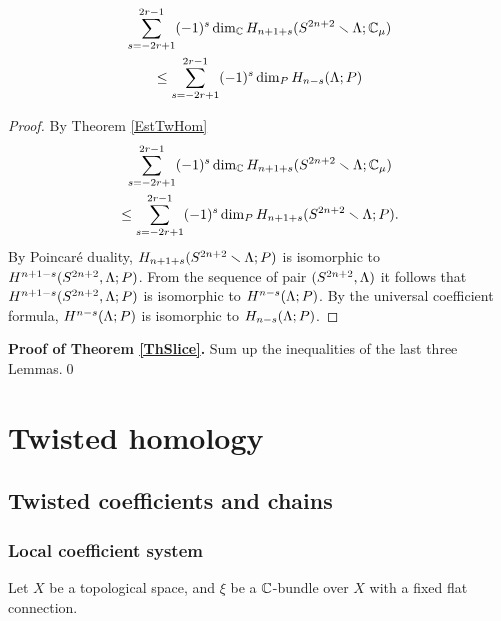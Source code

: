 \documentclass{article}
\numberwithin{equation}{section}
\begin{document}
\begin{lem}\label{Lemma4Th}
\begin{multline} 
\sum_{s=-2r+1}^{2r-1}(-1)^s\dim_\mathbb C H_{n+1+s}(S^{2n+2}\smallsetminus\Lambda;\mathbb C_\mu)\\
\le \sum_{s=-2r+1}^{2r-1}(-1)^s\dim_P H_{n-s}(\Lambda;P)
\end{multline}
\end{lem}

\begin{proof} 
By Theorem \ref{EstTwHom}
\begin{multline} 
\sum_{s=-2r+1}^{2r-1}(-1)^s\dim_\mathbb C H_{n+1+s}(S^{2n+2}\smallsetminus\Lambda;\mathbb C_\mu)\\
\le \sum_{s=-2r+1}^{2r-1}(-1)^s\dim_P H_{n+1+s}(S^{2n+2}\smallsetminus\Lambda;P).
\end{multline}
By Poincar\'{e} duality,
$H_{n+1+s}(S^{2n+2}\smallsetminus\Lambda;P)$ is isomorphic to 
$H^{n+1-s}(S^{2n+2},\Lambda;P)$.
From the  sequence of pair $(S^{2n+2},\Lambda)$ it follows that 
$H^{n+1-s}(S^{2n+2},\Lambda;P)$ is isomorphic 
to $H^{n-s}(\Lambda;P)$. By the universal coefficient formula, 
$H^{n-s}(\Lambda;P)$ is isomorphic
to $H_{n-s}(\Lambda;P)$. 
\end{proof}
\medskip

\noindent
{\bf Proof of Theorem \ref{ThSlice}.} 
Sum up the inequalities of the last three Lemmas.\qed 



  \renewcommand\thesection{\appendixname}
  \renewcommand\thesubsection{\Alph{subsection}}
  \renewcommand\thesubsubsection{\Alph{subsection}.\arabic{subsubsection}}
  \renewcommand\theequation{\Alph{subsection}.\arabic{equation}} 


\section{Twisted homology}

\vspace{10pt}

\subsection{Twisted coefficients and chains}\label{sT.1}

\subsubsection{Local coefficient system}\label{sT.1.1} 
Let $X$ be a topological space, and $\xi$ be a $\mathbb C$-bundle over $X$
with a fixed flat connection. 
\end{document}
